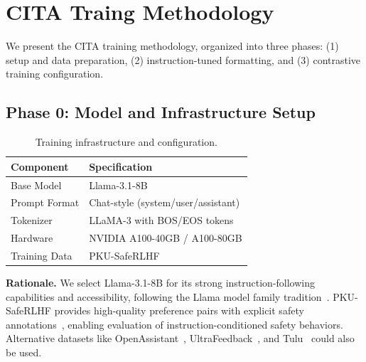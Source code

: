 

\clearpage
\newpage

\vspace{-2mm}
\section{CITA Traing Methodology}
\label{sec:methodology}

We present the CITA training methodology, organized into three phases: (1) setup and data preparation, (2) instruction-tuned formatting, and (3) contrastive training configuration.

\vspace{-2mm}
\subsection{Phase 0: Model and Infrastructure Setup}
\label{sec:phase0}

\begin{table}[H]
\centering
\small
\setlength{\tabcolsep}{6pt}
\renewcommand{\arraystretch}{1.2}
\begin{tabular}{@{}ll@{}}
\toprule
\textbf{Component} & \textbf{Specification} \\
\midrule
Base Model & Llama-3.1-8B~\cite{dubey2024llama} \\ \hline
Prompt Format & Chat-style (system/user/assistant) \\ \hline
Tokenizer & LLaMA-3 with BOS/EOS tokens \\ \hline
Hardware & NVIDIA A100-40GB / A100-80GB \\ \hline
Training Data & PKU-SafeRLHF~\cite{ji2024pku} \\
\bottomrule
\end{tabular}
\caption{Training infrastructure and configuration.}
\label{tab:infrastructure}
\vspace{-4mm}
\end{table}

\textbf{Rationale.} We select Llama-3.1-8B for its strong instruction-following capabilities and accessibility, following the Llama model family tradition~\cite{touvron2023llama,touvron2023llama1,dubey2024llama3}. PKU-SafeRLHF provides high-quality preference pairs with explicit safety annotations~\cite{bai2022training}, enabling evaluation of instruction-conditioned safety behaviors. Alternative datasets like OpenAssistant~\cite{kopf2023openassistant}, UltraFeedback~\cite{cui2023ultrafeedback}, and Tulu~\cite{ivison2023camels} could also be used.

